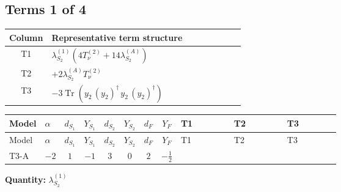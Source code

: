 \documentclass[8pt]{article}
\begin{document}
\begin{landscape}
\subsection*{Terms 1 of 4}
\begin{center}
\begin{tabular}{@{}c >{\raggedright\arraybackslash}p{0.82\linewidth}@{}}
\toprule
Column & Representative term structure \\
\midrule
T1 & \(\displaystyle {\lambda_{S_2}^{(1)}} (4 T_{\nu}^{(2)}+14 {\lambda_{S_2}^{(A)}})\) \\
\midrule
T2 & \(\displaystyle +2 {\lambda_{S_2}^{(A)}} T_{\nu}^{(2)}\) \\
\midrule
T3 & \(\displaystyle -3 \operatorname{Tr}\!\left({y_2}\,\left({y_2}\right)^{\dagger}\,{y_2}\,\left({y_2}\right)^{\dagger}\right)\) \\
\midrule
\bottomrule
\end{tabular}
\end{center}
\smallskip
\tiny
\begin{longtable}{@{}llcccccc >{\raggedright\arraybackslash}p{0.21\linewidth} >{\raggedright\arraybackslash}p{0.21\linewidth} >{\raggedright\arraybackslash}p{0.21\linewidth}@{}}
\toprule
Model & $\alpha$ & $d_{S_1}$ & $Y_{S_1}$ & $d_{S_2}$ & $Y_{S_2}$ & $d_F$ & $Y_F$ & T1 & T2 & T3 \\
\midrule
\endfirsthead
\toprule
Model & $\alpha$ & $d_{S_1}$ & $Y_{S_1}$ & $d_{S_2}$ & $Y_{S_2}$ & $d_F$ & $Y_F$ & T1 & T2 & T3 \\
\midrule
\endhead
T3-A & $-2$ & $1$ & $-1$ & $3$ & $0$ & $2$ & $-\frac{1}{2}$ & \scriptsize\adjustbox{max width=\linewidth}{$\begin{gathered} {\lambda_{S_2}^{(1)}} (4 T_{\nu}^{(2)}+14 {\lambda_{S_2}^{(A)}})\end{gathered}$} & \scriptsize\adjustbox{max width=\linewidth}{$\begin{gathered} +2 {\lambda_{S_2}^{(A)}} T_{\nu}^{(2)}\end{gathered}$} & \scriptsize\adjustbox{max width=\linewidth}{$\begin{gathered} -3 \operatorname{Tr}\!\left({y_2}\,\left({y_2}\right)^{\dagger}\,{y_2}\,\left({y_2}\right)^{\dagger}\right)\end{gathered}$} \\
\midrule
\bottomrule
\end{longtable}
\clearpage
\noindent\textbf{Quantity: }$\lambda_{S_2}^{(1)}$\par\smallskip

\end{landscape}
\end{document}
